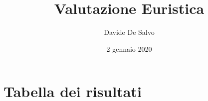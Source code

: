 \documentclass[french]{article}
\title{Valutazione Euristica}
\author{Davide De Salvo}
\date{2 gennaio 2020}
\begin{document}
\maketitle

\section{Tabella dei risultati}




\end{document}
